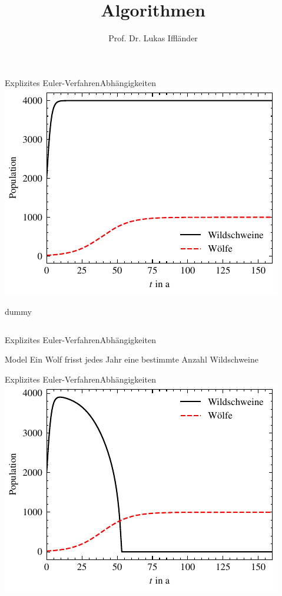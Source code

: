 \documentclass[xelatex,aspectratio=169]{beamer}
\title{Algorithmen}
\author{Prof. Dr. Lukas Iffländer}
\institute{HTW Dresden}
\date{}
\begin{document}
\begin{frame}{Explizites Euler-Verfahren}{Abhängigkeiten}
    \centering
    \includegraphics[height=.8\textheight]{fig/sim_dependency_a.pdf}
\end{frame}

\begin{frame}{dummy}
    \inputminted[firstline=19 lastline=23]{python}{src/sim_dependency_a.py}
\end{frame}

\begin{frame}{Explizites Euler-Verfahren}{Abhängigkeiten}
    \begin{block}{Model}
        Ein Wolf frisst jedes Jahr eine bestimmte Anzahl Wildschweine
    \end{block}
\end{frame}

\begin{frame}{Explizites Euler-Verfahren}{Abhängigkeiten}
    \centering
    \includegraphics[height=.8\textheight]{fig/sim_dependency_b.pdf}
\end{frame}
\end{document}
